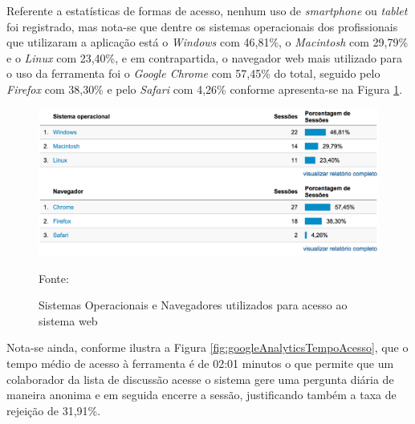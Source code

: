 \FloatBarrier 	%
			
Referente a estatísticas de formas de acesso, nenhum uso de \textit{smartphone}
ou \textit{tablet} foi registrado, mas nota-se que dentre os sistemas
operacionais dos profissionais que utilizaram a aplicação está o
\textit{Windows} com 46,81\%, o \textit{Macintosh} com 29,79\% e o
\textit{Linux} com 23,40\%, e em contrapartida, o navegador web mais utilizado 
para o uso da ferramenta foi o \textit{Google Chrome} com 57,45\% do total,
seguido pelo \textit{Firefox} com 38,30\% e pelo \textit{Safari} com 4,26\%
conforme apresenta-se na Figura
\ref{fig:googleAnalyticsSistemaOperacionalNavegador}.

\begin{figure}[h!tb]
	\caption{Sistemas Operacionais e Navegadores utilizados para acesso ao
	sistema web}
	\label{fig:googleAnalyticsSistemaOperacionalNavegador}

	\centering
	\includegraphics[width=\textwidth]{images/resultados/google-analytics-os-browser.png}

	\centering
	\footnotesize Fonte: \fonteOAutor
\end{figure}

\FloatBarrier 	%

Nota-se ainda, conforme ilustra a Figura \ref{fig:googleAnalyticsTempoAcesso},
que o tempo médio de acesso à ferramenta é de 02:01 minutos o que permite que um 
colaborador da lista de discussão acesse o sistema gere uma pergunta diária de
maneira anonima e em seguida encerre a sessão, justificando também a taxa de
rejeição de 31,91\%.

